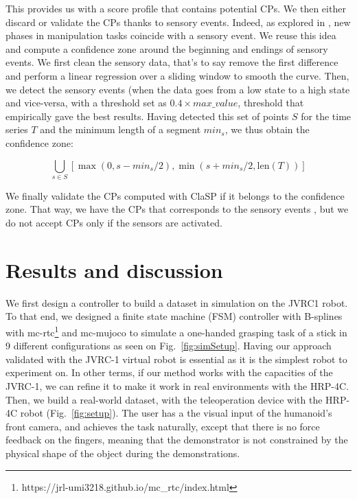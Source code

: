 \documentclass[a4paper, 10pt, conference]{ieeeconf}
\begin{document}
This provides us with a score profile that contains potential CPs. We then either discard or validate the CPs thanks to sensory events. Indeed, as explored in \cite{sensory_seg}, new phases in manipulation tasks coincide  with a sensory event. We reuse this idea and compute a confidence zone around the beginning and endings of sensory events. We first clean the sensory data, that's to say remove the first difference and perform a linear regression over a sliding window to smooth the curve. Then,  we detect the sensory events  (when the data goes from a low state to a high  state and vice-versa, with a threshold set as $0.4\times max\_value$, threshold that empirically gave the best results. Having detected this set of points $S$ for the time series $T$ and the minimum length of a segment $min_s$, we thus obtain the confidence zone:

\begin{equation}
        \bigcup_{s \in S} \left[ \max(0, s - min_s/2),\min(s + min_s/2, \text{len}(T)) \right]
\end{equation}

We finally validate the CPs computed with ClaSP if it belongs to the confidence zone. That way, we have the CPs that corresponds to the sensory events , but we do not accept CPs only if the sensors are activated.

\section{Results and discussion} \label{results}

 We first design a controller to build a dataset in  simulation on the JVRC1 robot. To that end, we designed a finite state machine (FSM) controller with B-splines with mc-rtc\footnote{https://jrl-umi3218.github.io/mc\_rtc/index.html} and mc-mujoco\cite{singh2023mc} to simulate a one-handed grasping task of a stick in 9 different configurations as seen on Fig.~\ref{fig:simSetup}. Having our approach validated with the JVRC-1 virtual robot is essential as it is the simplest robot to experiment on. In other terms, if our method works with the capacities of the JVRC-1, we can refine it to make it work in real environments with the HRP-4C. Then, we build a real-world dataset, with the teleoperation device  with the HRP-4C robot (Fig.~\ref{fig:setup}). The user has a the visual input of the humanoid's front camera, and achieves the task naturally, except that there is no force  feedback on the fingers, meaning that the demonstrator is not constrained by the physical shape of the object during the demonstrations.
\end{document}
